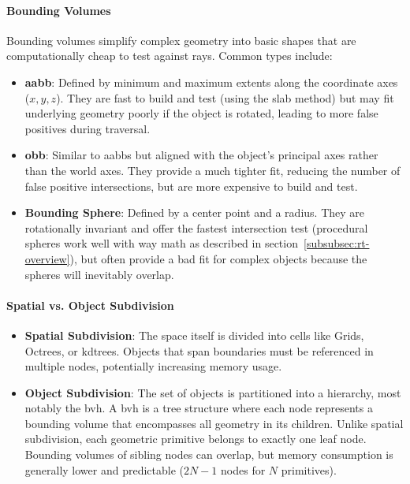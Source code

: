 \paragraph{Bounding Volumes}\label{par:bounding-volumes}

Bounding volumes simplify complex geometry into basic shapes
that are computationally cheap to test against rays.
Common types include:

\begin{itemize}
    \item \textbf{\gls{aabb}}: {
        Defined by minimum and maximum extents along the coordinate axes ($x, y, z$).
        They are fast to build and test (using the slab method) but may fit underlying geometry poorly
        if the object is rotated, leading to more false positives during traversal.
    }
    \item \textbf{\gls{obb}}: {
        Similar to \glspl{aabb} but aligned with the object's principal axes rather than the world axes.
        They provide a much tighter fit, reducing the number of false positive intersections,
        but are more expensive to build and test.
    }
    \item \textbf{Bounding Sphere}: {
        Defined by a center point and a radius.
        They are rotationally invariant and offer the fastest intersection test
        (procedural spheres work well with way math as described in section~\ref{subsubsec:rt-overview}),
        but often provide a bad fit for complex objects because the spheres will inevitably overlap.
    }
\end{itemize}

\paragraph{Spatial vs. Object Subdivision}\label{par:subdivision-types}

\begin{itemize}
    \item \textbf{Spatial Subdivision}:
        The space itself is divided into cells like Grids, Octrees, or \glspl{kdtree}.
        Objects that span boundaries must be referenced in multiple nodes, potentially increasing memory usage.
    \item \textbf{Object Subdivision}:
        The set of objects is partitioned into a hierarchy, most notably the \gls{bvh}.
        A \gls{bvh} is a tree structure where each node represents a bounding volume
        that encompasses all geometry in its children.
        Unlike spatial subdivision, each geometric primitive belongs to exactly one leaf node.
        Bounding volumes of sibling nodes can overlap,
        but memory consumption is generally lower and predictable ($2N-1$ nodes for $N$ primitives).
\end{itemize}

